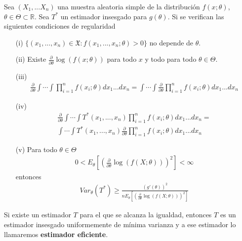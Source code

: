 \begin{teo}
    Sea $(X_1,...X_n)$ una muestra aleatoria simple de la distribución $f(x;\theta)$, $\theta \in \Theta \subset \mathbb{R}$. Sea $T^*$ un estimador insesgado para $g(\theta)$. Si se verifican las siguientes condiciones de regularidad
    \begin{enumerate}
        \item[(i)] $\{ (x_1,...,x_n) \in \mathfrak{X} : f(x_1,...,x_n;\theta) > 0 \}$ no depende de $\theta$.
        \item[(ii)] Existe $\frac{\partial}{\partial \theta} \log(f(x;\theta))$ para todo $x$ y todo para todo $\theta \in \Theta$.
        \item[(iii)]
              \begin{align*}
                  \frac{\partial}{\partial \theta} \int \cdots \int \prod_{i=1}^{n}{f(x_i;\theta)} dx_1 ... dx_n = \int \cdots \int \frac{\partial}{\partial \theta}  \prod_{i=1}^{n}{f(x_i;\theta)} dx_1 ... dx_n
              \end{align*}
        \item[(iv)]
              \begin{align*}
                  \frac{\partial}{\partial \theta} \int \cdots \int T^*(x_1,...,x_n)\prod_{i=1}^{n}{f(x_i;\theta)} dx_1 ... dx_n = \\
                  \int \cdots \int T^*(x_1,...,x_n)\frac{\partial}{\partial \theta} \prod_{i=1}^{n}{f(x_i;\theta)} dx_1 ... dx_n
              \end{align*}
        \item[(v)] Para todo $\theta \in \Theta$
              \begin{align*}
                  0 < E_{\theta}\left[ \left( \frac{\partial}{\partial \theta}\log(f(X;\theta)) \right)^2\right] < \infty
              \end{align*}
              entonces
              \begin{align*}
                  Var_{\theta}(T^*) \ge \frac{(g'(\theta))^2}{nE_{\theta}\left[ \left( \frac{\partial}{\partial \theta}\log(f(X;\theta)) \right)^2\right]}
              \end{align*}
    \end{enumerate}
\end{teo}

\begin{obs}
    Si existe un estimador $T$ para el que se alcanza la igualdad, entonces $T$ es un estimador insesgado uniformemente de mínima varianza y a ese estimador lo llamaremos \textbf{estimador eficiente}.
\end{obs}

